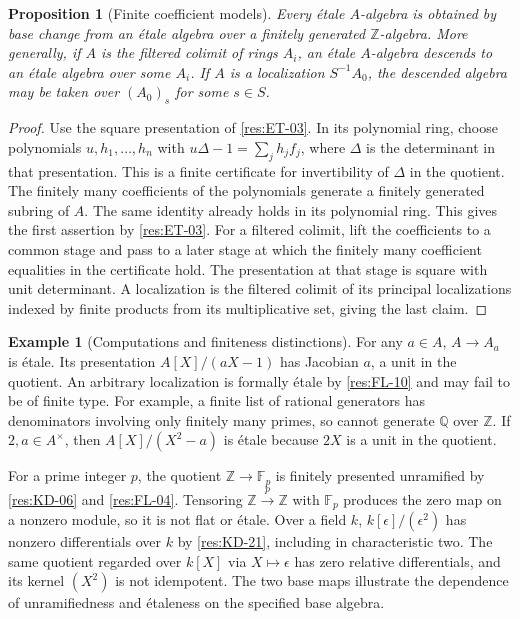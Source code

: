 \documentclass[11pt,oneside,openany]{book}
\newtheorem{proposition}[theorem]{Proposition}
\theoremstyle{definition}
\newtheorem{example}[theorem]{Example}
\theoremstyle{remark}
\begin{document}
\begin{proposition}[Finite coefficient models]\label{res:ET-15}
Every \'{e}tale $A$-algebra is obtained by base change from an
\'etale algebra over a finitely generated $\mathbb Z$-algebra.
More generally, if $A$ is the filtered colimit of rings $A_i$,
an \'{e}tale $A$-algebra descends to an \'{e}tale algebra over
some $A_i$. If $A$ is a localization $S^{-1}A_0$, the descended
algebra may be taken over $(A_0)_s$ for some $s\in S$.
\end{proposition}
\begin{proof}
Use the square presentation of \ref{res:ET-03}. In its polynomial
ring, choose polynomials $u,h_1,\ldots,h_n$ with
$u\Delta-1=\sum_j h_jf_j$, where $\Delta$ is the determinant in
that presentation. This is a finite certificate for invertibility
of $\Delta$ in the quotient. The finitely many coefficients of
the polynomials generate a finitely generated subring of $A$.
The same identity already holds in its polynomial ring. This
gives the first assertion by \ref{res:ET-03}.
For a filtered colimit, lift the coefficients to a common stage
and pass to a later stage at which the finitely many coefficient
equalities in the certificate hold. The presentation at that
stage is square with unit determinant. A localization is the
filtered colimit of its principal localizations indexed by
finite products from its multiplicative set, giving the last claim.
\end{proof}

\begin{example}[Computations and finiteness distinctions]\label{res:ET-16}
For any $a\in A$, $A\to A_a$ is \'{e}tale. Its presentation
$A[X]/(aX-1)$ has Jacobian $a$, a unit in the quotient.
An arbitrary localization is formally \'{e}tale by \ref{res:FL-10}
and may fail to be of finite type. For
example, a finite list of rational generators has denominators
involving only finitely many primes, so cannot generate $\mathbb Q$
over $\mathbb Z$. If $2,a\in A^\times$, then $A[X]/(X^2-a)$
is \'{e}tale because $2X$ is a unit in the quotient.

For a prime integer $p$, the quotient
$\mathbb Z\to\mathbb F_p$ is finitely presented unramified
by \ref{res:KD-06} and \ref{res:FL-04}. Tensoring
$\mathbb Z\xrightarrow{p}\mathbb Z$ with $\mathbb F_p$ produces
the zero map on a nonzero module, so it is not flat or \'{e}tale.
Over a field $k$, $k[\epsilon]/(\epsilon^2)$ has nonzero
differentials over $k$ by \ref{res:KD-21}, including in
characteristic two. The same quotient regarded over $k[X]$ via
$X\mapsto\epsilon$ has zero relative differentials, and its
kernel $(X^2)$ is not idempotent. The two base maps illustrate
the dependence of unramifiedness and \'{e}taleness on the
specified base algebra.
\end{example}
\end{document}
